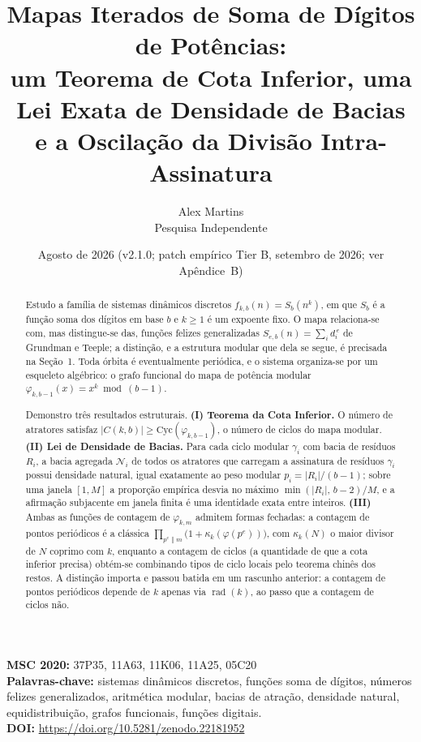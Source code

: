 \documentclass[11pt]{article}
\title{\textbf{Mapas Iterados de Soma de Dígitos de Potências:\\ um Teorema de Cota Inferior, uma Lei Exata de Densidade de Bacias\\ e a Oscilação da Divisão Intra-Assinatura}}
\author{Alex Martins\\ \small Pesquisa Independente}
\date{Agosto de 2026 (v2.1.0; patch empírico Tier B, setembro de 2026; ver Apêndice~B)}
\theoremstyle{definition}
\theoremstyle{remark}
\newcommand{\Cyc}{\mathrm{Cyc}}
\DeclareMathOperator{\rad}{rad}
\begin{document}
\maketitle

\begin{center}
\small \textbf{MSC 2020:} 37P35, 11A63, 11K06, 11A25, 05C20\\
\small \textbf{Palavras-chave:} sistemas dinâmicos discretos, funções soma de dígitos, números felizes generalizados, aritmética modular, bacias de atração, densidade natural, equidistribuição, grafos funcionais, funções digitais.\\
\small \textbf{DOI:} \url{https://doi.org/10.5281/zenodo.22181952}
\end{center}

\begin{abstract}
Estudo a família de sistemas dinâmicos discretos $f_{k,b}(n) = S_b(n^k)$, em que $S_b$ é a função soma dos dígitos em base $b$ e $k \ge 1$ é um expoente fixo. O mapa relaciona-se com, mas distingue-se das, funções felizes generalizadas $S_{e,b}(n) = \sum_i d_i^{\,e}$ de Grundman e Teeple; a distinção, e a estrutura modular que dela se segue, é precisada na Seção~1. Toda órbita é eventualmente periódica, e o sistema organiza-se por um esqueleto algébrico: o grafo funcional do mapa de potência modular $\varphi_{k,b-1}(x) = x^k \bmod (b-1)$.

Demonstro três resultados estruturais. \textbf{(I) Teorema da Cota Inferior.} O número de atratores satisfaz $|C(k,b)| \ge \Cyc(\varphi_{k,b-1})$, o número de ciclos do mapa modular. \textbf{(II) Lei de Densidade de Bacias.} Para cada ciclo modular $\gamma_i$ com bacia de resíduos $R_i$, a bacia agregada $\mathcal{N}_i$ de todos os atratores que carregam a assinatura de resíduos $\gamma_i$ possui densidade natural, igual exatamente ao peso modular $p_i = |R_i|/(b-1)$; sobre uma janela $[1,M]$ a proporção empírica desvia no máximo $\min(|R_i|,\,b-2)/M$, e a afirmação subjacente em janela finita é uma identidade exata entre inteiros. \textbf{(III)} Ambas as funções de contagem de $\varphi_{k,m}$ admitem formas fechadas: a contagem de pontos periódicos é a clássica $\prod_{p^e \| m}\big(1 + \kappa_k(\varphi(p^e))\big)$, com $\kappa_k(N)$ o maior divisor de $N$ coprimo com $k$, enquanto a contagem de ciclos (a quantidade de que a cota inferior precisa) obtém-se combinando tipos de ciclo locais pelo teorema chinês dos restos. A distinção importa e passou batida em um rascunho anterior: a contagem de pontos periódicos depende de $k$ apenas via $\rad(k)$, ao passo que a contagem de ciclos não.


\end{abstract}
\end{document}
